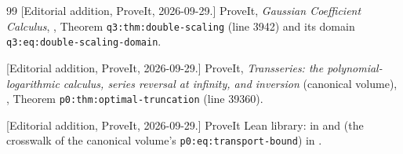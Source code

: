 \documentclass[11pt,a4paper]{article}
\numberwithin{equation}{section}
\theoremstyle{plain}
\theoremstyle{definition}
\theoremstyle{remark}
\begin{document}
\begin{thebibliography}{99}
[Editorial addition, ProveIt, 2026-09-29.] ProveIt, \emph{Gaussian
Coefficient Calculus},
,
Theorem \texttt{q3:thm:double-scaling} (line 3942) and its domain
\texttt{q3:eq:double-scaling-domain}.

[Editorial addition, ProveIt, 2026-09-29.] ProveIt, \emph{Transseries: the
polynomial-logarithmic calculus, series reversal at infinity, and
inversion} (canonical volume),
,
Theorem \texttt{p0:thm:optimal-truncation} (line 39360).

[Editorial addition, ProveIt, 2026-09-29.] ProveIt Lean library:
 in
and  (the crosswalk of the canonical volume's
\texttt{p0:eq:transport-bound}) in
.
\end{thebibliography}
\end{document}
